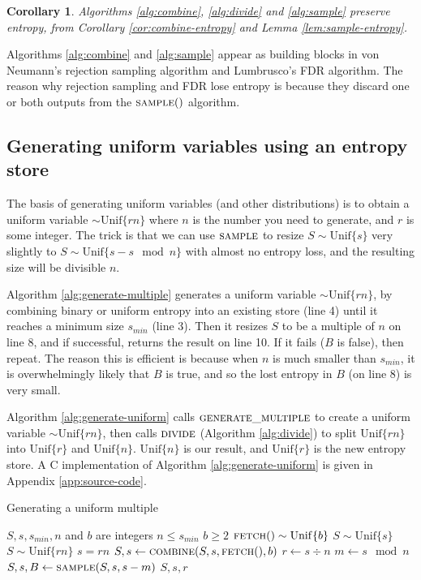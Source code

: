 \documentclass[12pt]{article}
\newtheorem{corollary}{Corollary}
\newcommand{\unif}[1]{\mathrm{Unif}\{#1\}}
\begin{document}
\begin{corollary}
    Algorithms \ref{alg:combine}, \ref{alg:divide} and \ref{alg:sample} preserve entropy, from Corollary \ref{cor:combine-entropy} and Lemma \ref{lem:sample-entropy}.
\end{corollary}

Algorithms \ref{alg:combine} and \ref{alg:sample} appear as building blocks in von Neumann's rejection sampling algorithm and Lumbrusco's FDR algorithm. The reason why rejection sampling and FDR lose entropy is because they discard one or both outputs from the $\textsc{sample}()$ algorithm.



\subsection{Generating uniform variables using an entropy store}

The basis of generating uniform variables (and other distributions) is to obtain a uniform variable $\sim \unif{rn}$ where $n$ is the number you need to generate, and $r$ is some integer. The trick is that we can use $\textsc{sample}$ to resize $S \sim \unif{s}$ very slightly to $S \sim \unif{s - s \mod n}$ with almost no entropy loss, and the resulting size will be divisible $n$.

Algorithm \ref{alg:generate-multiple} generates a uniform variable $\sim \unif{rn}$, by combining binary or uniform entropy into an existing store (line 4) until it reaches a minimum size $s_{min}$ (line 3). Then it resizes $S$ to be a multiple of $n$ on line 8, and if successful, returns the result on line 10. If it fails ($B$ is false), then repeat. The reason this is efficient is because when $n$ is much smaller than $s_{min}$, it is overwhelmingly likely that $B$ is true, and so the lost entropy in $B$ (on line 8) is very small.

Algorithm \ref{alg:generate-uniform} calls $\textsc{generate\_multiple}$ to create a uniform variable $\sim \unif{rn}$, then calls $\textsc{divide}$ (Algorithm \ref{alg:divide}) to split $\unif{rn}$ into $\unif{r}$ and $\unif{n}$. $\unif{n}$ is our result, and $\unif{r}$ is the new entropy store. A C implementation of Algorithm \ref{alg:generate-uniform} is given in Appendix \ref{app:source-code}.

\begin{algorithm}
\caption{Generating a uniform multiple}
\label{alg:generate-multiple}
\begin{algorithmic}[1]
\Require $S, s, s_{min}, n$ and $b$ are integers
\Require $n \le s_{min}$
\Require $b \ge 2$
\Require $\textsc{fetch}() \sim \unif{b}$
\Require $S \sim \unif{s}$
\Ensure $S \sim \unif{rn}$
\Ensure $s = rn$
        \State $S, s \gets \textsc{combine}(S, s, \textsc{fetch}(), b)$
    \EndWhile
    \State $r \gets s \div n$
    \State $m \gets s \mod n$
    \State $S, s, B \gets \textsc{sample}(S, s, s-m)$ 
        \State \Return $S, s, r$
    \EndIf
  \EndWhile
\EndProcedure
\end{algorithmic}
\end{algorithm}
\end{document}
